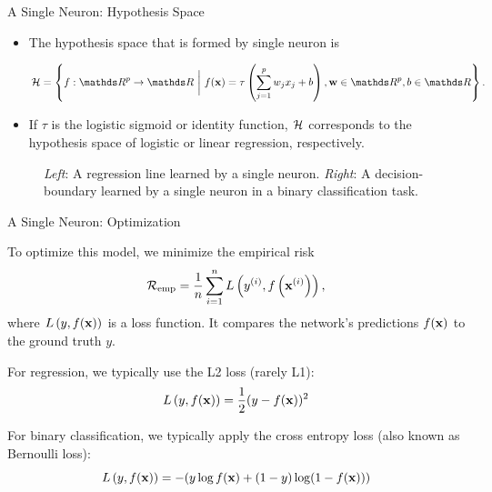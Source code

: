 \documentclass[11pt,compress,t,notes=noshow, xcolor=table]{beamer}
\begin{document}
\begin{vbframe}{A Single Neuron: Hypothesis Space}
\begin{itemize}
\item The hypothesis space that is formed by single neuron %
is 
\begin{small}
$$\Hspace  = \left\{f: \R^p \to \R ~\bigg|~ \fx = \tau\left(\sum_{j = 1}^p w_j x_j + b\right), \wtw \in \R^p, b \in \R\right\}.$$ 
\end{small}
\item If $\tau$ is the logistic sigmoid or identity function, $\mathcal{H}$ corresponds to the hypothesis space of logistic or linear regression, respectively.
\end{itemize}
\vspace*{-0.45cm}
\begin{figure}
\centering
{}
\vspace*{-0.2cm}
\begin{tiny}
\caption{\textit{Left}: A regression line learned by a single neuron. \textit{Right}: A decision-boundary learned by a single neuron in a binary classification task.}
\end{tiny}
\end{figure}
\end{vbframe}

\begin{framei} {A Single Neuron: Optimization}
\item To optimize this model, we minimize the empirical risk 
$$\mathcal{R}_{\text{emp}} = \frac{1}{n} \sum\limits_{i=1}^n L\left(y^{(i)}, f\left(\mathbf{x}^{(i)}\right)\right),$$
where $L\left(y, f(\mathbf{x})\right)$ is a loss function. It compares the network's predictions $f(\mathbf{x})$ to the ground truth $y$. 
\item For regression, we typically use the L2 loss (rarely L1): $$L\left(y, f(\mathbf{x})\right) = \frac{1}{2}(y - f(\mathbf{x}))^2$$
\item For binary classification, we typically apply the cross entropy loss (also known as Bernoulli loss): $$L\left(y, f(\mathbf{x})\right) = -(y \log f(\mathbf{x}) + (1 - y) \log(1 - f(\mathbf{x})))$$
\end{framei}
\end{document}
